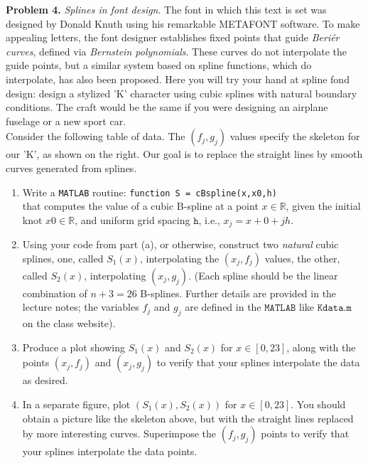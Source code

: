 \documentclass[14pt,a4paper]{article}
\begin{document}
\label{Problem 4}
\large\textbf{Problem 4.} \textit{Splines in font design}. The font in which this text is set was designed by Donald Knuth using his remarkable METAFONT software. To make appealing letters, the font designer establishes fixed points that guide \textit{Beriér curves}, defined via \textit{Bernstein polynomials}. These curves do not interpolate the guide points, but a similar system based on spline functions, which do interpolate, has also been proposed. Here you will try your hand at spline fond design: design a stylized 'K' character using cubic splines with natural boundary conditions. The craft would be the same if you were designing an airplane fuselage or a new sport car.\\
Consider  the following table of data. The $(f_j,g_j)$ values specify the skeleton for our 'K', as shown on the right. Our goal is to replace the straight lines by smooth curves generated from splines.\\
\begin{enumerate}
	\label{4a}
	\item Write a \texttt{MATLAB} routine: \texttt{function S = cBspline(x,x0,h)} \\
	that computes the value of a cubic B-spline at a point $x \in \mathbb{R}$, given the initial knot $x0 \in \mathbb{R}$, and uniform grid spacing $\mathtt{h}$, i.e., $x_j = x+0 + jh$.\\
	
	
	\label{4b}	
	\item Using your code from part (a), or otherwise, construct two \textit{natural} cubic splines, one, called $S_1(x)$, interpolating the $(x_j,f_j)$ values, the other, called $S_2(x)$, interpolating $(x_j,g_j)$. (Each spline should be the linear combination of $n+3=26$ B-splines. Further details are provided in the lecture notes; the variables $f_j$ and $g_j$ are defined in the $\mathtt{MATLAB}$ like $\mathtt{Kdata.m}$ on the class website).\\
	
	\label{4c}
	\item Produce a plot showing $S_1(x)$ and $S_2(x)$ for $x \in [0,23]$, along with the points $(x_j,f_j)$ and $(x_j,g_j)$ to verify that your splines interpolate the data as desired.\\
	
	\label{4d}
	\item In a separate figure, plot $(S_1(x),S_2(x))$ for $x \in [0,23]$. You should obtain a picture like the skeleton above, but with the straight lines replaced by more interesting curves. Superimpose the $(f_j,g_j)$ points to verify that your splines interpolate the data points.\\

\end{enumerate} 
\end{document}

